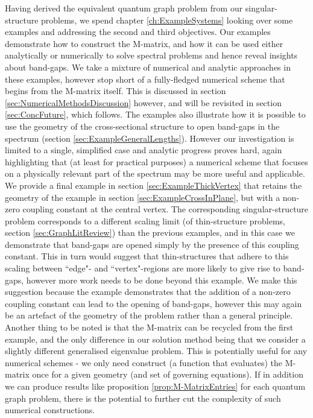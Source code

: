 Having derived the equivalent quantum graph problem from our singular-structure problems, we spend chapter \ref{ch:ExampleSystems} looking over some examples and addressing the second and third objectives.
Our examples demonstrate how to construct the M-matrix, and how it can be used either analytically or numerically to solve spectral problems and hence reveal insights about band-gaps.
We take a mixture of numerical and analytic approaches in these examples, however stop short of a fully-fledged numerical scheme that begins from the M-matrix itself.
This is discussed in section \ref{sec:NumericalMethodsDiscussion} however, and will be revisited in section \ref{sec:ConcFuture}, which follows.
The examples also illustrate how it is possible to use the geometry of the cross-sectional structure to open band-gaps in the spectrum (section \ref{sec:ExampleGeneralLengths}).
However our investigation is limited to a single, simplified case and analytic progress proves hard, again highlighting that (at least for practical purposes) a numerical scheme that focuses on a physically relevant part of the spectrum may be more useful and applicable.
We provide a final example in section \ref{sec:ExampleThickVertex} that retains the geometry of the example in section \ref{sec:ExampleCrossInPlane}, but with a non-zero coupling constant at the central vertex.
The corresponding singular-structure problem corresponds to a different scaling limit (of thin-structure problems, section \ref{sec:GraphLitReview}) than the previous examples, and in this case we demonstrate that band-gaps are opened simply by the presence of this coupling constant.
This in turn would suggest that thin-structures that adhere to this scaling between ``edge"- and ``vertex"-regions are more likely to give rise to band-gaps, however more work needs to be done beyond this example.
We make this suggestion because the example demonstrates that the addition of a non-zero coupling constant can lead to the opening of band-gaps, however this may again be an artefact of the geometry of the problem rather than a general principle.
Another thing to be noted is that the M-matrix can be recycled from the first example, and the only difference in our solution method being that we consider a slightly different generalised eigenvalue problem.
This is potentially useful for any numerical schemes - we only need construct (a function that evaluates) the M-matrix once for a given geometry (and set of governing equations).
If in addition we can produce results like proposition \ref{prop:M-MatrixEntries} for each quantum graph problem, there is the potential to further cut the complexity of such numerical constructions. \newline

